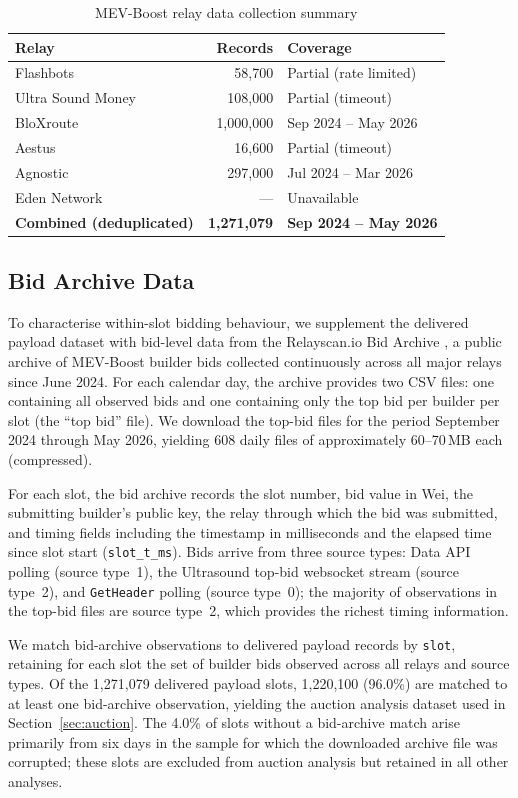\documentclass[11pt]{article}
\begin{document}
\begin{table}[h]
\centering
\caption{MEV-Boost relay data collection summary}
\label{tab:relays}
\begin{tabular}{lrl}
\toprule
Relay & Records & Coverage \\
\midrule
Flashbots & 58,700 & Partial (rate limited) \\
Ultra Sound Money & 108,000 & Partial (timeout) \\
BloXroute & 1,000,000 & Sep 2024 -- May 2026 \\
Aestus & 16,600 & Partial (timeout) \\
Agnostic & 297,000 & Jul 2024 -- Mar 2026 \\
Eden Network & --- & Unavailable \\
\midrule
\textbf{Combined (deduplicated)} & \textbf{1,271,079} & \textbf{Sep 2024 -- May 2026} \\
\bottomrule
\end{tabular}
\end{table}

\subsection{Bid Archive Data}

To characterise within-slot bidding behaviour, we supplement the delivered
payload dataset with bid-level data from the Relayscan.io Bid Archive
\citep{relayscan2024}, a public archive of MEV-Boost builder bids collected
continuously across all major relays since June 2024. For each calendar day,
the archive provides two CSV files: one containing all observed bids and one
containing only the top bid per builder per slot (the ``top bid'' file). We
download the top-bid files for the period September 2024 through May 2026,
yielding 608 daily files of approximately 60--70\,MB each (compressed).

For each slot, the bid archive records the slot number, bid value in Wei, the
submitting builder's public key, the relay through which the bid was submitted,
and timing fields including the timestamp in milliseconds and the elapsed time
since slot start (\texttt{slot\_t\_ms}). Bids arrive from three source types:
Data API polling (source type~1), the Ultrasound top-bid websocket stream
(source type~2), and \texttt{GetHeader} polling (source type~0); the majority
of observations in the top-bid files are source type~2, which provides the
richest timing information.

We match bid-archive observations to delivered payload records by \texttt{slot},
retaining for each slot the set of builder bids observed across all relays and
source types. Of the 1,271,079 delivered payload slots, 1,220,100 (96.0\%) are
matched to at least one bid-archive observation, yielding the auction analysis
dataset used in Section~\ref{sec:auction}. The 4.0\% of slots without a bid-archive match
arise primarily from six days in the sample for which the downloaded archive
file was corrupted; these slots are excluded from auction analysis but retained
in all other analyses.
\end{document}
